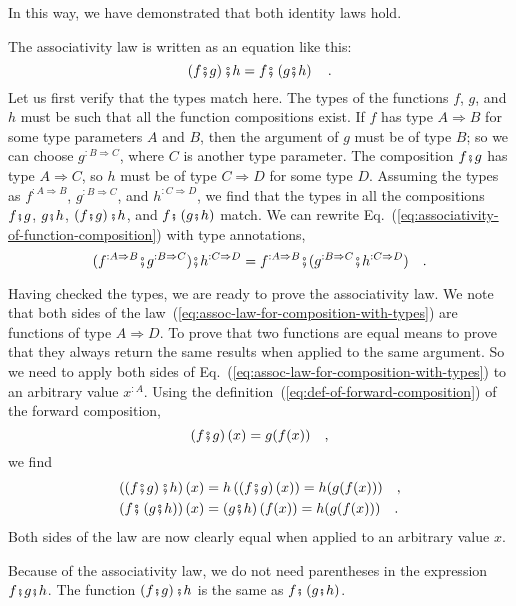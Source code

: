 In this way, we have demonstrated that both identity laws hold. 

The associativity law is written as an equation like this:
\begin{equation}
\left(f\bef g\right)\bef h=f\bef\left(g\bef h\right)\quad.\label{eq:associativity-of-function-composition}
\end{equation}
Let us first verify that the types match here. The types of the functions
$f$, $g$, and $h$ must be such that all the function compositions
exist. If $f$ has type $A\Rightarrow B$ for some type parameters
$A$ and $B$, then the argument of $g$ must be of type $B$; so
we can choose $g^{:B\Rightarrow C}$, where $C$ is another type parameter.
The composition $f\bef g$ has type $A\Rightarrow C$, so $h$ must
be of type $C\Rightarrow D$ for some type $D$. Assuming the types
as $f^{:A\Rightarrow B}$, $g^{:B\Rightarrow C}$, and $h^{:C\Rightarrow D}$,
we find that the types in all the compositions $f\bef g$, $g\bef h$,
$\left(f\bef g\right)\bef h$, and $f\bef\left(g\bef h\right)$ match.
We can rewrite Eq.~(\ref{eq:associativity-of-function-composition})
with type annotations, 
\begin{equation}
(f^{:A\Rightarrow B}\bef g^{:B\Rightarrow C})\bef h^{:C\Rightarrow D}=f^{:A\Rightarrow B}\bef(g^{:B\Rightarrow C}\bef h^{:C\Rightarrow D})\quad.\label{eq:assoc-law-for-composition-with-types}
\end{equation}

Having checked the types, we are ready to prove the associativity
law. We note that both sides of the law~(\ref{eq:assoc-law-for-composition-with-types})
are functions of type $A\Rightarrow D$. To prove that two functions
are equal means to prove that they always return the same results
when applied to the same argument. So we need to apply both sides
of Eq.~(\ref{eq:assoc-law-for-composition-with-types}) to an arbitrary
value $x^{:A}$. Using the definition~(\ref{eq:def-of-forward-composition})
of the forward composition, 
\[
\left(f\bef g\right)(x)=g(f(x))\quad,
\]
we find
\begin{align*}
\left(\left(f\bef g\right)\bef h\right)(x) & =h\left(\left(f\bef g\right)(x)\right)=h(g(f(x)))\quad,\\
\left(f\bef\left(g\bef h\right)\right)(x) & =\left(g\bef h\right)(f(x))=h(g(f(x)))\quad.
\end{align*}
Both sides of the law are now clearly equal when applied to an arbitrary
value $x$.

Because of the associativity law, we do not need parentheses in the
expression $f\bef g\bef h$. The function $\left(f\bef g\right)\bef h$
is the same as $f\bef\left(g\bef h\right)$.

